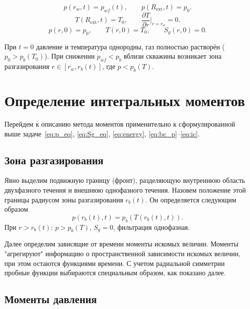 \documentclass[12pt,a4paper]{article}
\newcommand{\pp}{\partial}
\newcommand{\ext}{\mathrm{ext}}
\begin{document}
\begin{equation}\label{eq:bc_p}
  p(r_w, t) = p_{wf}(t), \qquad
  p(R_\ext, t) = p_0.
\end{equation}
\begin{equation}\label{eq:bc_T}
  T(R_\ext, t) = T_0, \qquad
  \frac{\pp T}{\pp r}\bigg|_{r = r_w} = 0.
\end{equation}
\begin{equation}\label{eq:ic}
  p(r, 0) = p_0, \qquad T(r, 0) = T_0, \qquad S_g(r, 0) = 0.
\end{equation}

При $t = 0$ давление и температура однородны, газ полностью
растворён ($p_0 > p_b(T_0)$). При снижении $p_{wf} < p_b$
вблизи скважины возникает зона разгазирования
$r \in [r_w, r_b(t)]$, где $p < p_b(T)$.


\section{Определение интегральных моментов}\label{sec:moments_def}

Перейдем к описанию метода моментов применительно к сформулированной выше 
задаче~\eqref{eq:p_eq}, \eqref{eq:Sg_eq}, \eqref{eq:energy}, \eqref{eq:bc_p}--\eqref{eq:ic}.

\subsection{Зона разгазирования}
Явно выделим подвижную границу (фронт), разделяющую внутреннюю область двухфазного течения 
и внешнюю однофазного течения. Назовем положение этой границы радиусом зоны 
разгазирования $r_b(t)$. Он определяется следующим образом
\begin{equation}\label{eq:rb}
  p(r_b(t), t) = p_b(T(r_b(t), t)).
\end{equation}
При $r > r_b(t)$: $p > p_b(T)$, $S_g = 0$, фильтрация однофазная.

Далее определим зависящие от времени моменты искомых величин.
Моменты "агрегируют" информацию о пространственной зависимости искомых величин,
при этом остаются функциями времени. С учетом радиальной симметрии 
пробные функции выбираются специальным образом, как показано далее.


\subsection{Моменты давления}
\end{document}
